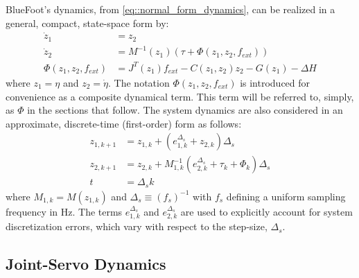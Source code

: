 			BlueFoot's dynamics, from \ref{eq::normal_form_dynamics}, can be realized in a general, compact, state-space form by:
				\begin{equation}
					\begin{split}
					\dot{z}_{1} 				&= z_{2} \\
					\dot{z}_{2} 				&= M^{-1}(z_{1})(\tau + \Phi(z_{1},z_{2},f_{ext})) \\
					\Phi(z_{1},z_{2},f_{ext}) 	&= J^T(z_{1}) f_{ext} - C(z_{1},z_{2})z_{2} - G(z_{1}) - \Delta{H}
					\end{split}
					\label{eq::state_space_dynamics}
				\end{equation}
			where $z_{1}=\eta$ and $z_{2}=\dot{\eta}$. The notation $\Phi(z_{1},z_{2},f_{ext})$ is introduced for convenience as a composite dynamical term. This term will be referred to, simply, as $\Phi$ in the sections that follow. The system dynamics are also considered in an approximate, discrete-time (first-order) form as follows:
				\begin{equation}
					\begin{split}
					{z}_{1,k+1} &= {z}_{1,k} + ( {e}_{1,k}^{\Delta_{s}} + {z}_{2,k} )\Delta_{s} \\
					{z}_{2,k+1} &= {z}_{2,k} + M^{-1}_{1,k}( {e}_{2,k}^{\Delta_{s}} + \tau_{k} + \Phi_{k}) \Delta_{s} \\
					t 			&= \Delta_{s} k
					\end{split}
					\label{eq::sampled_dynamics}
				\end{equation}
			where $M_{1,k} = M(z_{1,k})$ and $\Delta_{s} \equiv (f_{s})^{-1}$ with $f_{s}$ defining a uniform sampling frequency in Hz. The terms ${e}_{1,k}^{\Delta_{s}}$ and ${e}_{2,k}^{\Delta_{s}}$ are used to explicitly account for system discretization errors, which vary with respect to the step-size, $\Delta_{s}$. 

		\subsection{Joint-Servo Dynamics}

